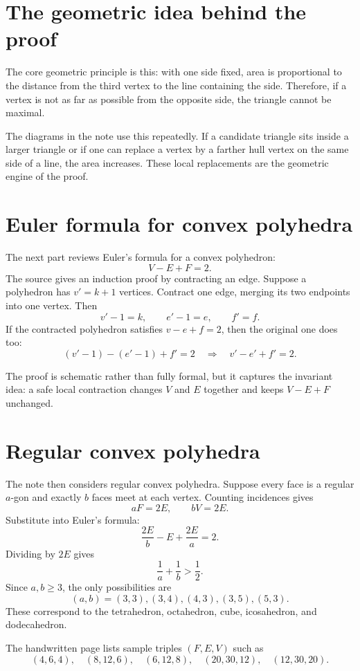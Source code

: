 \section{The geometric idea behind the proof}

The core geometric principle is this: with one side fixed, area is proportional to the distance from the third vertex to the line containing the side.  Therefore, if a vertex is not as far as possible from the opposite side, the triangle cannot be maximal.

The diagrams in the note use this repeatedly.  If a candidate triangle sits inside a larger triangle or if one can replace a vertex by a farther hull vertex on the same side of a line, the area increases.  These local replacements are the geometric engine of the proof.

\section{Euler formula for convex polyhedra}

The next part reviews Euler's formula for a convex polyhedron:
\[
  V-E+F=2.
\]
The source gives an induction proof by contracting an edge.  Suppose a polyhedron has $v'=k+1$ vertices.  Contract one edge, merging its two endpoints into one vertex.  Then
\[
  v'-1=k,\qquad e'-1=e,\qquad f'=f.
\]
If the contracted polyhedron satisfies $v-e+f=2$, then the original one does too:
\[
  (v'-1)-(e'-1)+f'=2
  \quad\Longrightarrow\quad
  v'-e'+f'=2.
\]

The proof is schematic rather than fully formal, but it captures the invariant idea: a safe local contraction changes $V$ and $E$ together and keeps $V-E+F$ unchanged.

\section{Regular convex polyhedra}

The note then considers regular convex polyhedra.  Suppose every face is a regular $a$-gon and exactly $b$ faces meet at each vertex.  Counting incidences gives
\[
  aF=2E,\qquad bV=2E.
\]
Substitute into Euler's formula:
\[
  \frac{2E}{b}-E+\frac{2E}{a}=2.
\]
Dividing by $2E$ gives
\[
  \frac1a+\frac1b>\frac12.
\]
Since $a,b\ge3$, the only possibilities are
\[
  (a,b)=(3,3),(3,4),(4,3),(3,5),(5,3).
\]
These correspond to the tetrahedron, octahedron, cube, icosahedron, and dodecahedron.

The handwritten page lists sample triples $(F,E,V)$ such as
\[
  (4,6,4),\quad (8,12,6),\quad (6,12,8),\quad (20,30,12),\quad (12,30,20).
\]


